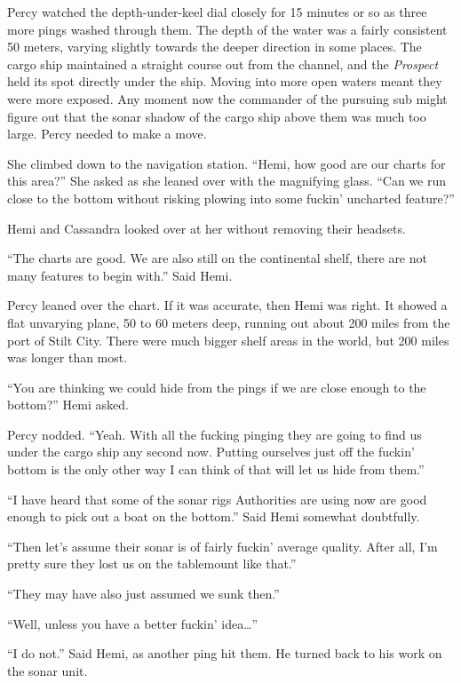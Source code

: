 \documentclass[
]{scrbook}
\begin{document}
Percy watched the depth-under-keel dial closely for 15 minutes or so as
three more pings washed through them. The depth of the water was a
fairly consistent 50 meters, varying slightly towards the deeper
direction in some places. The cargo ship maintained a straight course
out from the channel, and the \emph{Prospect} held its spot directly
under the ship. Moving into more open waters meant they were more
exposed. Any moment now the commander of the pursuing sub might figure
out that the sonar shadow of the cargo ship above them was much too
large. Percy needed to make a move.

She climbed down to the navigation station. ``Hemi, how good are our
charts for this area?'' She asked as she leaned over with the magnifying
glass. ``Can we run close to the bottom without risking plowing into
some fuckin' uncharted feature?''

Hemi and Cassandra looked over at her without removing their headsets.

``The charts are good. We are also still on the continental shelf, there
are not many features to begin with.'' Said Hemi.

Percy leaned over the chart. If it was accurate, then Hemi was right. It
showed a flat unvarying plane, 50 to 60 meters deep, running out about
200 miles from the port of Stilt City. There were much bigger shelf
areas in the world, but 200 miles was longer than most.

``You are thinking we could hide from the pings if we are close enough
to the bottom?'' Hemi asked.

Percy nodded. ``Yeah. With all the fucking pinging they are going to
find us under the cargo ship any second now. Putting ourselves just off
the fuckin' bottom is the only other way I can think of that will let us
hide from them.''

``I have heard that some of the sonar rigs Authorities are using now are
good enough to pick out a boat on the bottom.'' Said Hemi somewhat
doubtfully.

``Then let's assume their sonar is of fairly fuckin' average quality.
After all, I'm pretty sure they lost us on the tablemount like that.''

``They may have also just assumed we sunk then.''

``Well, unless you have a better fuckin' idea\ldots{}''

``I do not.'' Said Hemi, as another ping hit them. He turned back to his
work on the sonar unit.
\end{document}
